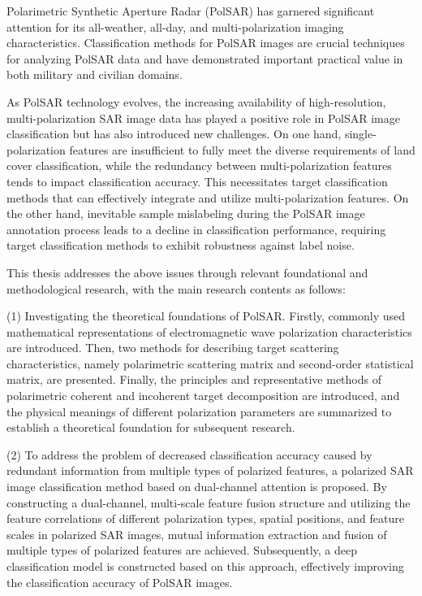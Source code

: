 
\begin{englishabstract}
    Polarimetric Synthetic Aperture Radar (PolSAR) has garnered significant attention for its all-weather, all-day, and multi-polarization imaging characteristics. Classification methods for PolSAR images are crucial techniques for analyzing PolSAR data and have demonstrated important practical value in both military and civilian domains.

    As PolSAR technology evolves, the increasing availability of high-resolution, multi-polarization SAR image data has played a positive role in PolSAR image classification but has also introduced new challenges. On one hand, single-polarization features are insufficient to fully meet the diverse requirements of land cover classification, while the redundancy between multi-polarization features tends to impact classification accuracy. This necessitates target classification methods that can effectively integrate and utilize multi-polarization features. On the other hand, inevitable sample mislabeling during the PolSAR image annotation process leads to a decline in classification performance, requiring target classification methods to exhibit robustness against label noise.

    This thesis addresses the above issues through relevant foundational and methodological research, with the main research contents as follows:

    (1) Investigating the theoretical foundations of PolSAR. Firstly, commonly used mathematical representations of electromagnetic wave polarization characteristics are introduced. Then, two methods for describing target scattering characteristics, namely polarimetric scattering matrix and second-order statistical matrix, are presented. Finally, the principles and representative methods of polarimetric coherent and incoherent target decomposition are introduced, and the physical meanings of different polarization parameters are summarized to establish a theoretical foundation for subsequent research.

    (2) To address the problem of decreased classification accuracy caused by redundant information from multiple types of polarized features, a polarized SAR image classification method based on dual-channel attention is proposed. By constructing a dual-channel, multi-scale feature fusion structure and utilizing the feature correlations of different polarization types, spatial positions, and feature scales in polarized SAR images, mutual information extraction and fusion of multiple types of polarized features are achieved. Subsequently, a deep classification model is constructed based on this approach, effectively improving the classification accuracy of PolSAR images.


\end{englishabstract}
